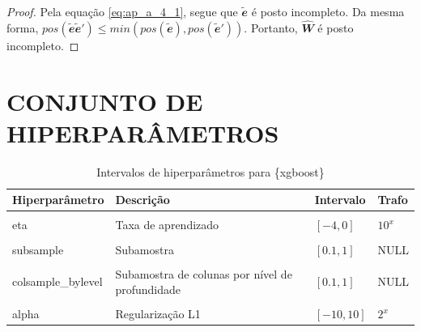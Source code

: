 \begin{apendicesenv}
\begin{proof}
  Pela equação \eqref{eq:ap_a_4_1}, segue que $\mathbfit{\tilde{e}}$ é posto incompleto. Da mesma forma, $pos(\mathbfit{\tilde{e}\tilde{e}'}) \leq min(pos(\mathbfit{\tilde{e}}), pos(\mathbfit{\tilde{e}'}))$. Portanto, $\mathbfit{\hat{W}}$ é posto incompleto.
\end{proof}

\chapter{CONJUNTO DE HIPERPARÂMETROS} \label{apendice_hiperparametros}

\begin{table}

  \caption{\label{tab:tbl-hip-xgboost}Intervalos de hiperparâmetros para \{xgboost\}}
  \centering
  \begin{tabular}[t]{llll}
  \toprule
  Hiperparâmetro & Descrição & Intervalo & Trafo\\
  \midrule
  \cellcolor{gray!6}{nrounds} & \cellcolor{gray!6}{Número de iterações} & \cellcolor{gray!6}{$[1, 5000]$} & \cellcolor{gray!6}{NULL}\\
  eta & Taxa de aprendizado & $[-4, 0]$ & $10^x$\\
  \cellcolor{gray!6}{max\_depth} & \cellcolor{gray!6}{Profundidade máxima} & \cellcolor{gray!6}{$[1, 20]$} & \cellcolor{gray!6}{NULL}\\
  subsample & Subamostra & $[0.1, 1]$ & NULL\\
  \cellcolor{gray!6}{colsample\_bytree} & \cellcolor{gray!6}{Subamostra de colunas para uma árvore} & \cellcolor{gray!6}{$[0.1, 1]$} & \cellcolor{gray!6}{NULL}\\
  \addlinespace
  colsample\_bylevel & Subamostra de colunas por nível de profundidade & $[0.1, 1]$ & NULL\\
  \cellcolor{gray!6}{lambda} & \cellcolor{gray!6}{Regularização L2} & \cellcolor{gray!6}{$[-10, 10]$} & \cellcolor{gray!6}{$2^x$}\\
  alpha & Regularização L1 & $[-10, 10]$ & $2^x$\\
  \bottomrule
  \end{tabular}
\end{table}

\begin{table}


\end{table}
\end{apendicesenv}
